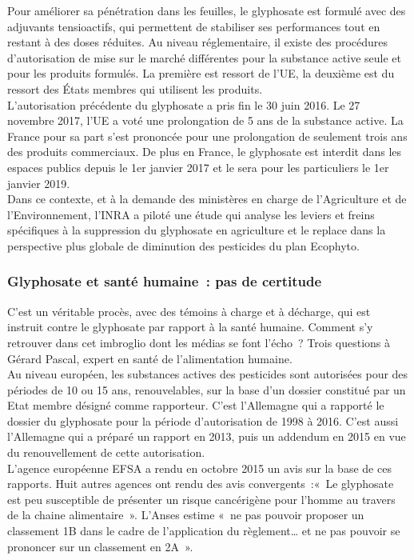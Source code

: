 \documentclass[8pt]{article}
\begin{document}
Pour améliorer sa pénétration dans les feuilles, le glyphosate est formulé avec des adjuvants tensioactifs, qui permettent de stabiliser ses performances tout en restant à des doses réduites. Au niveau réglementaire, il existe des procédures d’autorisation de mise sur le marché différentes pour la substance active seule et pour les produits formulés. La première est ressort de l’UE, la deuxième est du ressort des États membres qui utilisent les produits.\\

L’autorisation précédente du glyphosate a pris fin le 30 juin 2016. Le 27 novembre 2017, l’UE a voté une prolongation de 5 ans de la substance active. La France pour sa part s’est prononcée pour une prolongation de seulement trois ans des produits commerciaux. De plus en France, le glyphosate est interdit dans les espaces publics depuis le 1er janvier 2017 et le sera pour les particuliers le 1er janvier 2019.\\

Dans ce contexte, et à la demande des ministères en charge de l’Agriculture et de l’Environnement, l’INRA a piloté une étude qui analyse les leviers et freins spécifiques à la suppression du glyphosate en agriculture et le replace dans la perspective plus globale de diminution des pesticides du plan Ecophyto.

\subsubsection{Glyphosate et santé humaine~: pas de certitude}
C’est un véritable procès, avec des témoins à charge et à décharge, qui est instruit contre le glyphosate par rapport à la santé humaine. Comment s’y retrouver dans cet imbroglio dont les médias se font l’écho~? Trois questions à Gérard Pascal, expert en santé de l’alimentation humaine.\\

Au niveau européen, les substances actives des pesticides sont autorisées pour des périodes de 10 ou 15 ans, renouvelables, sur la base d’un dossier constitué par un Etat membre désigné comme rapporteur. C’est l’Allemagne qui a rapporté le dossier du glyphosate pour la période d’autorisation de 1998 à 2016. C’est aussi l’Allemagne qui a préparé un rapport en 2013, puis un addendum en 2015 en vue du renouvellement de cette autorisation.\\

L’agence européenne EFSA a rendu en octobre 2015 un avis sur la base de ces rapports. Huit autres agences ont rendu des avis convergents~:«~Le glyphosate est peu susceptible de présenter un risque cancérigène pour l’homme au travers de la chaine alimentaire~». L’Anses estime «~ne pas pouvoir proposer un classement 1B dans le cadre de l’application du règlement… et ne pas pouvoir se prononcer sur un classement en 2A~». \\
\end{document}
